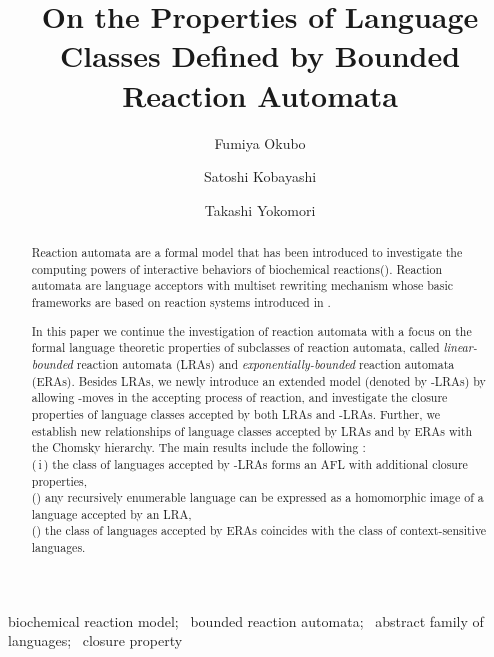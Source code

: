 \documentclass[preprint,fleqn,1p]{elsarticle}
\def\rnum#1{\resizebox{0.5em}{\height}{\expandafter{\romannumeral #1}}}
\begin{document}
\begin{frontmatter}


\title{On the Properties of Language Classes Defined by Bounded Reaction Automata}

\author[label1]{Fumiya Okubo}
\author[label2]{Satoshi Kobayashi}
\author[label3]{Takashi Yokomori}

\address[label1]{Graduate School of Education,
Waseda University, 1-6-1 Nishiwaseda, Shinjuku-ku, Tokyo 169-8050,
Japan}
\address[label2]{Graduate School of Informatics and Engineering,
University of Electro-Communications, 1-5-1 Chofugaoka, Chofu-shi, Tokyo 182-8585, Japan}
\address[label3]{Department of Mathematics,  Faculty of Education and Integrated Arts and Sciences,
Waseda University, 1-6-1 Nishiwaseda, Shinjuku-ku, Tokyo 169-8050,
Japan}

\begin{abstract}
Reaction automata are a formal model that has been introduced to  investigate the computing powers of interactive behaviors of biochemical reactions(\cite{OKY:12}). Reaction automata are language acceptors with multiset rewriting mechanism whose basic frameworks are based on reaction systems introduced in \cite{ER:07a}.  

In this paper we continue the investigation of reaction automata with  a  focus on the formal language theoretic properties of subclasses of reaction automata, called {\it linear-bounded} reaction automata (LRAs) and {\it exponentially-bounded} reaction automata (ERAs).    Besides LRAs, we newly introduce an extended model (denoted by -LRAs) by allowing -moves in the accepting process of reaction, and 
investigate the closure properties of language classes accepted by 
both LRAs and -LRAs.   Further, we  establish  new relationships of language classes accepted by LRAs and by ERAs  with the Chomsky hierarchy. 
The main results include the following : \\
\quad (\,i\,) the class of languages accepted by -LRAs forms an AFL with additional closure properties,\\
\quad (\rnum{2})  any recursively enumerable language can be expressed as  
a homomorphic image of a language accepted by an LRA,\\
\quad (\rnum{3}) the class of languages accepted by ERAs coincides with the class of context-sensitive languages. 
\end{abstract}

\begin{keyword}
biochemical reaction model; \  bounded reaction 
automata; \ abstract family of languages; \ closure property
\end{keyword}

\end{frontmatter}
\end{document}
